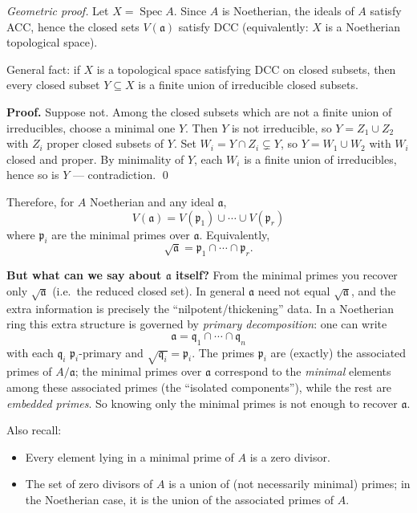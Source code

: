 \documentclass[11pt,a4paper]{article}
\theoremstyle{definition}
\theoremstyle{plain}
\theoremstyle{remark}
\newcommand{\Spec}{\operatorname{Spec}}
\begin{document}
\begin{proof}[Geometric proof]
Let $X=\Spec A$. Since $A$ is Noetherian, the ideals of $A$ satisfy ACC, hence the closed sets $V(\mathfrak a)$
satisfy DCC (equivalently: $X$ is a Noetherian topological space).

General fact: if $X$ is a topological space satisfying DCC on closed subsets, then every closed subset
$Y\subseteq X$ is a finite union of irreducible closed subsets.

\textbf{Proof.} Suppose not. Among the closed subsets which are not a finite union of irreducibles, choose a minimal one $Y$.
Then $Y$ is not irreducible, so $Y=Z_1\cup Z_2$ with $Z_i$ proper closed subsets of $Y$.
Set $W_i=Y\cap Z_i\subsetneq Y$, so $Y=W_1\cup W_2$ with $W_i$ closed and proper.
By minimality of $Y$, each $W_i$ is a finite union of irreducibles, hence so is $Y$ --- contradiction.
\qed
\end{proof}

Therefore, for $A$ Noetherian and any ideal $\mathfrak a$,
\[
V(\mathfrak a)=V(\mathfrak p_1)\cup\cdots\cup V(\mathfrak p_r)
\]
where $\mathfrak p_i$ are the minimal primes over $\mathfrak a$.
Equivalently,
\[
\sqrt{\mathfrak a}=\mathfrak p_1\cap\cdots\cap\mathfrak p_r.
\]

\medskip
\textbf{But what can we say about $\mathfrak a$ itself?}
From the minimal primes you recover only $\sqrt{\mathfrak a}$ (i.e.\ the reduced closed set).
In general $\mathfrak a$ need not equal $\sqrt{\mathfrak a}$, and the extra information is precisely
the ``nilpotent/thickening'' data. In a Noetherian ring this extra structure is governed by \emph{primary decomposition}:
one can write
\[
\mathfrak a=\mathfrak q_1\cap\cdots\cap\mathfrak q_n
\]
with each $\mathfrak q_i$ $\mathfrak p_i$-primary and $\sqrt{\mathfrak q_i}=\mathfrak p_i$.
The primes $\mathfrak p_i$ are (exactly) the associated primes of $A/\mathfrak a$;
the minimal primes over $\mathfrak a$ correspond to the \emph{minimal} elements among these associated primes
(the ``isolated components''), while the rest are \emph{embedded primes}.
So knowing only the minimal primes is not enough to recover $\mathfrak a$.

\bigskip

Also recall:
\begin{itemize}
\item Every element lying in a minimal prime of $A$ is a zero divisor.
\item The set of zero divisors of $A$ is a union of (not necessarily minimal) primes; in the Noetherian case,
it is the union of the associated primes of $A$.
\end{itemize}
\end{document}
